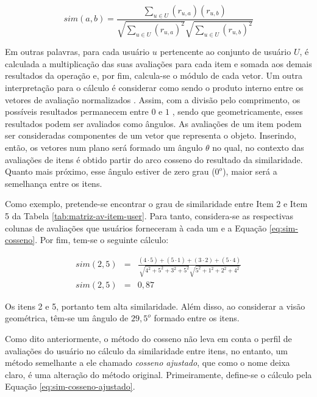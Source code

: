         \begin{equation} 
            sim(a, b) = \frac{\sum_{u\in U}(r_{u, a})(r_{u, b})}{\sqrt{\sum_{u\in U}(r_{u, a})^2}\sqrt{\sum_{u\in U}(r_{u, b})^2}} \label{eq:sim-cosseno}
        \end{equation}    
    
        Em outras palavras, para cada usuário $u$ pertencente ao conjunto de usuário $U$, é calculada a multiplicação das suas avaliações para cada item e somada aos demais resultados da operação e, por fim, calcula-se o módulo de cada vetor. Um outra interpretação para o cálculo é considerar como sendo o produto interno entre os vetores de avaliação normalizados \cite{Jones1987}. Assim, com a divisão pelo comprimento, os possíveis resultados permanecem entre $0$ e $1$ \cite{Jannach2010}, sendo que geometricamente, esses resultados podem ser avaliados como ângulos. As avaliações de um item podem ser consideradas componentes de um vetor que representa o objeto. Inserindo, então, os vetores num plano será formado um ângulo $\theta$ no qual, no contexto das avaliações de itens é obtido partir do arco cosseno do resultado da similaridade. Quanto mais próximo, esse ângulo estiver de zero grau ($0^o$), maior será a semelhança entre os itens.
        
        Como exemplo, pretende-se encontrar o grau de similaridade entre Item 2 e Item 5 da Tabela \ref{tab:matriz-av-item-user}. Para tanto, considera-se as respectivas colunas de avaliações que usuários forneceram à cada um e a Equação \ref{eq:sim-cosseno}. Por fim, tem-se o seguinte cálculo:
        
        \begin{eqnarray}
            sim(2, 5) &=& \frac{(4\cdot 5)+(5\cdot 1)+(3\cdot 2)+(5 \cdot 4)}{\sqrt{4^2+5^2+3^2+5^2}\sqrt{5^2+1^2+2^2+4^2}} \nonumber \\
            sim(2, 5) &=& 0,87 \nonumber
        \end{eqnarray}
        
        Os itens 2 e 5, portanto tem alta similaridade. Além disso, ao considerar a visão geométrica, têm-se um ângulo de $29,5^o$ formado entre os itens.
    
        Como dito anteriormente, o método do cosseno não leva em conta o perfil de avaliações do usuário no cálculo da similaridade entre itens, no entanto, um método semelhante a ele chamado \textit{cosseno ajustado}, que como o nome deixa claro, é uma alteração do método original. Primeiramente, define-se o cálculo pela Equação \ref{eq:sim-cosseno-ajustado}.
        
